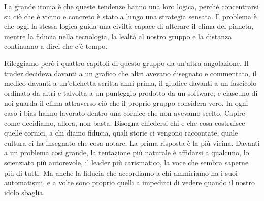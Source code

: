 La grande ironia \`{e} che queste tendenze hanno una loro logica, perch\'{e} concentrarsi su ci\`{o} che \`{e} vicino e concreto \`{e} stato a lungo una strategia sensata. Il problema \`{e} che oggi la stessa logica guida una civilt\`{a} capace di alterare il clima del pianeta, mentre la fiducia nella tecnologia, la lealt\`{a} al nostro gruppo e la distanza continuano a dirci che c'\`{e} tempo.

Rileggiamo per\`{o} i quattro capitoli di questo gruppo da un'altra angolazione. Il trader decideva davanti a un grafico che altri avevano disegnato e commentato, il medico davanti a un'etichetta scritta anni prima, il giudice davanti a un fascicolo ordinato da altri e talvolta a un punteggio prodotto da un software; e ciascuno di noi guarda il clima attraverso ci\`{o} che il proprio gruppo considera vero. In ogni caso i bias hanno lavorato dentro una cornice che non avevamo scelto. Capire come decidiamo, allora, non basta. Bisogna chiedersi chi e che cosa costruisce quelle cornici, a chi diamo fiducia, quali storie ci vengono raccontate, quale cultura ci ha insegnato che cosa notare. La prima risposta \`{e} la pi\`{u} vicina. Davanti a un problema cos\`{i} grande, la tentazione pi\`{u} naturale \`{e} affidarsi a qualcuno, lo scienziato pi\`{u} autorevole, il leader pi\`{u} carismatico, la voce che sembra saperne pi\`{u} di tutti. Ma anche la fiducia che accordiamo a chi ammiriamo ha i suoi automatismi, e a volte sono proprio quelli a impedirci di vedere quando il nostro idolo sbaglia.
